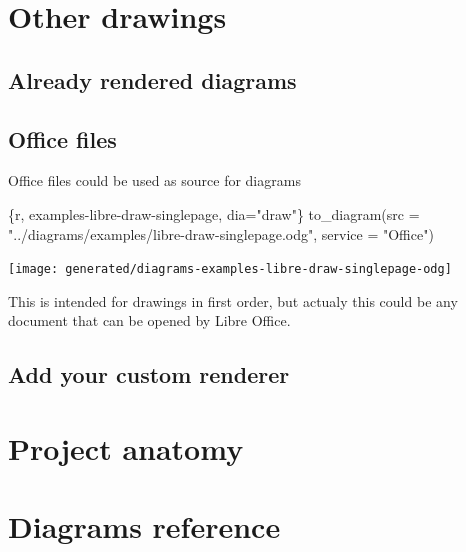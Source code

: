 \documentclass[
  12pt,
  a4paper,
  12pt,
  oneside,
  openany]{book}
\newenvironment{Shaded}{\begin{snugshade}}{\end{snugshade}}
\newcommand{\DataTypeTok}[1]{\textcolor[rgb]{0.27,0.27,0.27}{#1}}
\newcommand{\StringTok}[1]{\textcolor[rgb]{0.5,0.5,0.5}{#1}}
\begin{document}
\hypertarget{usage-other}{%
\chapter{Other drawings}\label{usage-other}}

\hypertarget{usage-rendered}{%
\section{Already rendered diagrams}\label{usage-rendered}}

\hypertarget{usage-office}{%
\section{Office files}\label{usage-office}}

Office files could be used as source for diagrams

\begin{Shaded}
\begin{Highlighting}[]
\StringTok{\textasciigrave{}\textasciigrave{}\textasciigrave{}}\DataTypeTok{\{r, examples{-}libre{-}draw{-}singlepage, dia="draw"\}}
\DataTypeTok{  to\_diagram(src = "../diagrams/examples/libre{-}draw{-}singlepage.odg", service = "Office")}
\StringTok{\textasciigrave{}\textasciigrave{}\textasciigrave{}}
\end{Highlighting}
\end{Shaded}

\begin{center}\texttt{[image: generated/diagrams-examples-libre-draw-singlepage-odg]} \end{center}

This is intended for drawings in first order, but actualy this could be any document that can be opened by Libre Office.

\hypertarget{usage-custom-dia-render}{%
\section{Add your custom renderer}\label{usage-custom-dia-render}}

\hypertarget{anatomy}{%
\chapter{Project anatomy}\label{anatomy}}

\hypertarget{diagrams-reference}{%
\chapter{Diagrams reference}\label{diagrams-reference}}
\end{document}
